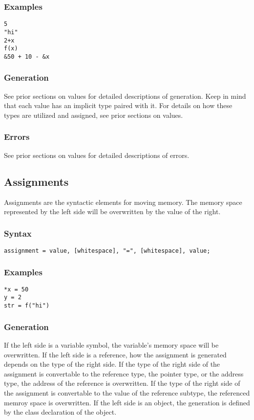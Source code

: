 \documentclass[10pt,a4paper]{article}
\begin{document}
\subsubsection{Examples}
\begin{verbatim}
5
"hi"
2+x
f(x)
&50 + 10 - &x
\end{verbatim}

\subsubsection{Generation}
See prior sections on values for detailed descriptions of generation. Keep in mind that each value has an implicit type paired with it. For details on how these types are utilized and assigned, see prior sections on values.

\subsubsection{Errors}
See prior sections on values for detailed descriptions of errors.

\newpage




\subsection{Assignments}
\label{sec:Assignments}
Assignments are the syntactic elements for moving memory. The memory space represented by the left side will be overwritten by the value of the right.

\subsubsection{Syntax}
\begin{verbatim}
assignment = value, [whitespace], "=", [whitespace], value;
\end{verbatim}

\subsubsection{Examples}
\begin{verbatim}
*x = 50
y = 2
str = f("hi")
\end{verbatim}

\subsubsection{Generation}
If the left side is a variable symbol, the variable's memory space will be overwritten. If the left side is a reference, how the assignment is generated depends on the type of the right side. If the type of the right side of the assignment is convertable to the reference type, the pointer type, or the address type, the address of the reference is overwritten. If the type of the right side of the assignment is convertable to the value of the reference subtype, the referenced memroy space is overwritten. If the left side is an object, the generation is defined by the class declaration of the object.
\end{document}
